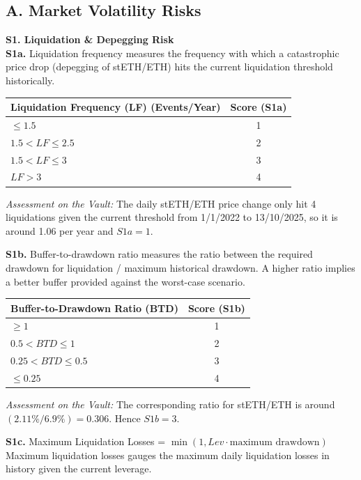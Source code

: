 \documentclass[11pt, a4paper]{article}
\begin{document}
\subsection*{A. Market Volatility Risks}

\textbf{S1. Liquidation \& Depegging Risk} \\
\textbf{S1a.} Liquidation frequency measures the frequency with which a catastrophic price drop (depegging of stETH/ETH) hits the current liquidation threshold historically.

\begin{tabularx}{0.6\textwidth}{@{} X c @{}}
\toprule
\textbf{Liquidation Frequency (LF) (Events/Year)} & \textbf{Score (S1a)} \\
\midrule
$\le 1.5$ & 1 \\
$1.5 < LF \le 2.5$ & 2 \\
$1.5 < LF \le 3$ & 3 \\
$LF > 3$ & 4 \\
\bottomrule
\end{tabularx}

\textit{Assessment on the Vault:} The daily stETH/ETH price change only hit 4 liquidations given the current threshold from 1/1/2022 to 13/10/2025, so it is around 1.06 per year and $S1a = 1$.

\textbf{S1b.} Buffer-to-drawdown ratio measures the ratio between the required drawdown for liquidation / maximum historical drawdown. A higher ratio implies a better buffer provided against the worst-case scenario.

\begin{tabularx}{0.6\textwidth}{@{} X c @{}}
\toprule
\textbf{Buffer-to-Drawdown Ratio (BTD)} & \textbf{Score (S1b)} \\
\midrule
$\ge 1$ & 1 \\
$0.5 < BTD \le 1$ & 2 \\
$0.25 < BTD \le 0.5$ & 3 \\
$\le 0.25$ & 4 \\
\bottomrule
\end{tabularx}

\textit{Assessment on the Vault:} The corresponding ratio for stETH/ETH is around $(2.11\% / 6.9\%) = 0.306$. Hence $S1b = 3$.

\textbf{S1c.} Maximum Liquidation Losses = $\min (1, Lev \cdot \text{maximum drawdown})$ \\
Maximum liquidation losses gauges the maximum daily liquidation losses in history given the current leverage.
\end{document}
